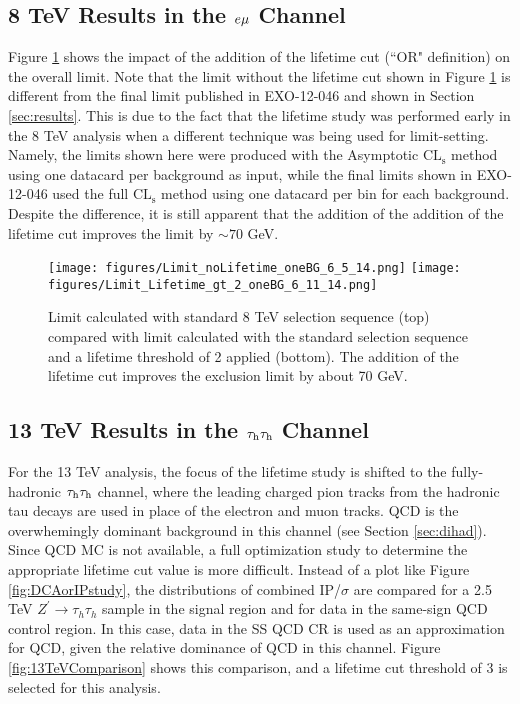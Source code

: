 \subsection{8 TeV Results in the $e\mu$ Channel}

Figure \ref{fig:8TeVLifetimeLimits} shows the impact of the addition of the lifetime cut (``OR" definition) on the overall limit. Note that the limit without the lifetime cut shown in Figure \ref{fig:8TeVLifetimeLimits} is different from the final limit published in EXO-12-046 and shown in Section \ref{sec:results}. This is due to the fact that the lifetime study was performed early in the 8 TeV analysis when a different technique was being used for limit-setting. Namely, the limits shown here were produced with the Asymptotic $\textrm{CL}_{\textrm{s}}$ method\cite{HiggsCombine} using one datacard per background as input, while the final limits shown in EXO-12-046 used the full $\textrm{CL}_{\textrm{s}}$ method\cite{HiggsCombine} using one datacard per bin for each background. Despite the difference, it is still apparent that the addition of the addition of the lifetime cut improves the limit by $\sim70$ GeV.

\begin{figure}[tbh!]
\centering
\texttt{[image: figures/Limit\_noLifetime\_oneBG\_6\_5\_14.png]}
\texttt{[image: figures/Limit\_Lifetime\_gt\_2\_oneBG\_6\_11\_14.png]}
\caption{Limit calculated with standard 8 TeV selection sequence (top) compared with limit calculated with the standard selection sequence and a lifetime threshold of 2 applied (bottom). The addition of the lifetime cut improves the exclusion limit by about 70 GeV.}
\label{fig:8TeVLifetimeLimits}
\end{figure}

\subsection{13 TeV Results in the $\tau_{\textrm{h}}\tau_{\textrm{h}}$ Channel}

For the 13 TeV analysis, the focus of the lifetime study is shifted to the fully-hadronic $\tau_{\textrm{h}}\tau_{\textrm{h}}$ channel, where the leading charged pion tracks from the hadronic tau decays are used in place of the electron and muon tracks. QCD is the overwhemingly dominant background in this channel (see Section \ref{sec:dihad}). Since QCD MC is not available, a full optimization study to determine the appropriate lifetime cut value is more difficult. Instead of a plot like Figure \ref{fig:DCAorIPstudy}, the distributions of combined IP/$\sigma$ are compared for a 2.5 TeV $Z^\prime\to\tau_h\tau_h$ sample in the signal region and for data in the same-sign QCD control region. In this case, data in the SS QCD CR is used as an approximation for QCD, given the relative dominance of QCD in this channel. Figure \ref{fig:13TeVComparison} shows this comparison, and a lifetime cut threshold of 3 is selected for this analysis.

